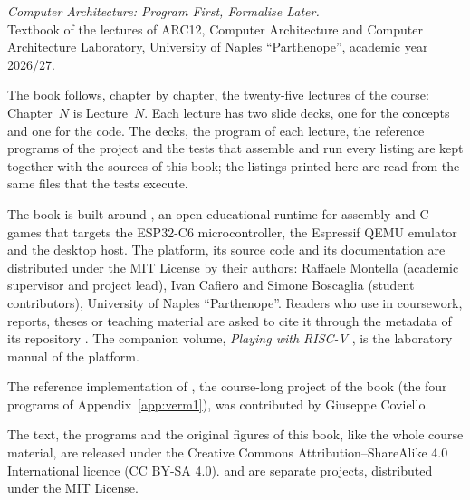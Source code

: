 \thispagestyle{empty}
\vspace*{\fill}
\noindent
{\small
\textit{Computer Architecture: Program First, Formalise Later.}\\
Textbook of the lectures of ARC12, Computer Architecture and Computer
Architecture Laboratory, University of Naples ``Parthenope'', academic year
2026/27.\par
\vspace{1em}

\noindent
The book follows, chapter by chapter, the twenty-five lectures of the course:
Chapter~$N$ is Lecture~$N$. Each lecture has two slide decks, one for the
concepts and one for the code. The decks, the program of each lecture, the
reference programs of the
\vermone project and the tests that assemble and run every listing are kept
together with the sources of this book; the listings printed here are read from
the same files that the tests execute.\par
\vspace{1em}

\noindent
The book is built around \prg, an open educational runtime for \riscv assembly
and C games that targets the ESP32\nobreakdash-C6 microcontroller, the Espressif
QEMU emulator and the \prgqt desktop host. The platform, its source code and
its documentation are distributed under the MIT License by their authors:
Raffaele Montella (academic supervisor and project lead), Ivan Cafiero and
Simone Boscaglia (student contributors), University of Naples ``Parthenope''.
Readers who use \prg in coursework, reports, theses or teaching material are
asked to cite it through the  metadata of its repository
\citep{prg32repo}. The companion volume, \emph{Playing with RISC-V}
\citep{prg32textbook}, is the laboratory manual of the platform.\par
\vspace{1em}

\noindent
The reference implementation of \vermone, the course-long project of the book
(the four programs of Appendix~\ref{app:verm1}), was contributed by Giuseppe
Coviello.\par
\vspace{1em}

\noindent
The text, the programs and the original figures of this book, like the whole
course material, are released under the Creative Commons Attribution--ShareAlike
4.0 International licence (CC BY-SA 4.0). \prg and \prgqt are separate
projects, distributed under the MIT License.\par
\vspace{1em}

}
